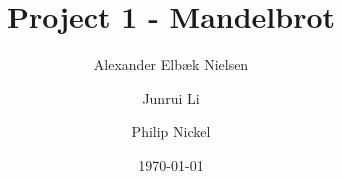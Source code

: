 \documentclass[aspectratio=169,hyperref={pdfpagelabels=false}]{beamer}
\title{Project 1 - Mandelbrot}
\author{Alexander Elbæk Nielsen\and Junrui Li \and Philip Nickel}
\institute{02616 Large Scale Modeling}
\date{\today}
\begin{document}
\inserttitlepage



\end{document}
